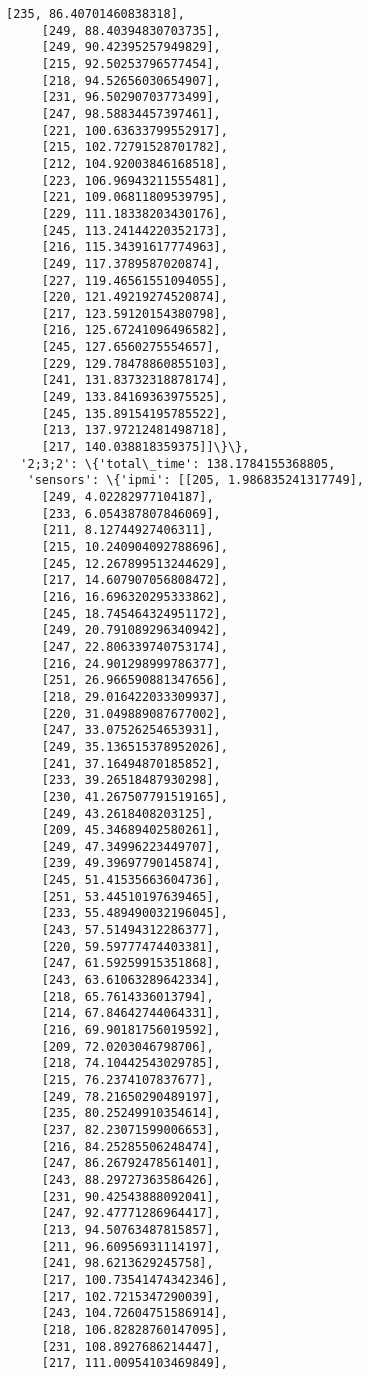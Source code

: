\documentclass[11pt]{article}
\begin{document}
\begin{tcolorbox}[breakable, size=fbox, boxrule=.5pt, pad at break*=1mm, opacityfill=0]
\begin{Verbatim}[commandchars=\\\{\}]
     [235, 86.40701460838318],
     [249, 88.40394830703735],
     [249, 90.42395257949829],
     [215, 92.50253796577454],
     [218, 94.52656030654907],
     [231, 96.50290703773499],
     [247, 98.58834457397461],
     [221, 100.63633799552917],
     [215, 102.72791528701782],
     [212, 104.92003846168518],
     [223, 106.96943211555481],
     [221, 109.06811809539795],
     [229, 111.18338203430176],
     [245, 113.24144220352173],
     [216, 115.34391617774963],
     [249, 117.3789587020874],
     [227, 119.46561551094055],
     [220, 121.49219274520874],
     [217, 123.59120154380798],
     [216, 125.67241096496582],
     [245, 127.6560275554657],
     [229, 129.78478860855103],
     [241, 131.83732318878174],
     [249, 133.84169363975525],
     [245, 135.89154195785522],
     [213, 137.97212481498718],
     [217, 140.038818359375]]\}\},
  '2;3;2': \{'total\_time': 138.1784155368805,
   'sensors': \{'ipmi': [[205, 1.986835241317749],
     [249, 4.02282977104187],
     [233, 6.054387807846069],
     [211, 8.12744927406311],
     [215, 10.240904092788696],
     [245, 12.267899513244629],
     [217, 14.607907056808472],
     [216, 16.696320295333862],
     [245, 18.745464324951172],
     [249, 20.791089296340942],
     [247, 22.806339740753174],
     [216, 24.901298999786377],
     [251, 26.966590881347656],
     [218, 29.016422033309937],
     [220, 31.049889087677002],
     [247, 33.07526254653931],
     [249, 35.136515378952026],
     [241, 37.16494870185852],
     [233, 39.26518487930298],
     [230, 41.267507791519165],
     [249, 43.2618408203125],
     [209, 45.34689402580261],
     [249, 47.34996223449707],
     [239, 49.39697790145874],
     [245, 51.41535663604736],
     [251, 53.44510197639465],
     [233, 55.489490032196045],
     [243, 57.51494312286377],
     [220, 59.59777474403381],
     [247, 61.59259915351868],
     [243, 63.61063289642334],
     [218, 65.7614336013794],
     [214, 67.84642744064331],
     [216, 69.90181756019592],
     [209, 72.0203046798706],
     [218, 74.10442543029785],
     [215, 76.2374107837677],
     [249, 78.21650290489197],
     [235, 80.25249910354614],
     [237, 82.23071599006653],
     [216, 84.25285506248474],
     [247, 86.26792478561401],
     [243, 88.29727363586426],
     [231, 90.42543888092041],
     [247, 92.47771286964417],
     [213, 94.50763487815857],
     [211, 96.60956931114197],
     [241, 98.6213629245758],
     [217, 100.73541474342346],
     [217, 102.7215347290039],
     [243, 104.72604751586914],
     [218, 106.82828760147095],
     [231, 108.8927686214447],
     [217, 111.00954103469849],

\end{Verbatim}
\end{tcolorbox}
\end{document}
